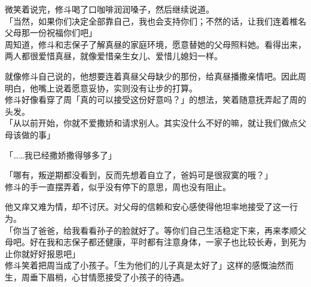 微笑着说完，修斗喝了口咖啡润润嗓子，然后继续说道。\\

「当然，如果你们决定全部靠自己，我也会支持你们；不然的话，让我们连着椎名父母那一份祝福你们吧」\\

周知道，修斗和志保子了解真昼的家庭环境，愿意替她的父母照料她。看得出来，两人都很爱惜真昼，就像爱惜亲生女儿、爱惜儿媳妇一样。

就像修斗自己说的，他想要连着真昼父母缺少的那份，给真昼播撒亲情吧。因此周明白，他嘴上说着愿意妥协，实则没有让步的打算。\\

修斗好像看穿了周「真的可以接受这份好意吗？」的想法，笑着随意抚弄起了周的头发。\\

「从以前开始，你就不爱撒娇和请求别人。其实没什么不好的嘛，就让我们做点父母该做的事」

「……我已经撒娇撒得够多了」

「哪有，叛逆期都没看到，反而先想着自立了，爸妈可是很寂寞的哦？」\\

修斗的手一直摆弄着，似乎没有停下的意思，周也没有阻止。

他又痒又难为情，却不讨厌。对父母的信赖和安心感使得他坦率地接受了这一行为。\\

「你当了爸爸，给我看看孙子的脸就好了。等你们自己生活稳定下来，再来孝顺父母吧。好在我和志保子都还健康，平时都有注意身体，一家子也比较长寿，到死为止你就好好报恩吧」\\

修斗笑着把周当成了小孩子。「生为他们的儿子真是太好了」这样的感慨油然而生，周垂下眉梢，心甘情愿接受了小孩子的待遇。
